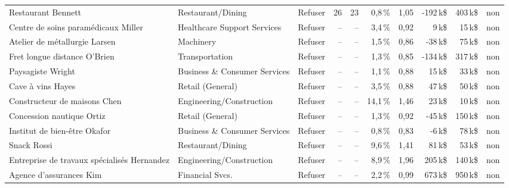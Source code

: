 {\begin{longtable}{p{3.7cm}p{2.5cm}lrrrrrrl}
Restaurant Bennett & Restaurant/Dining & Refuser & 26 & 23 & 0,8\,\% & 1,05 & -192\,k\$ & 403\,k\$ & non \\
Centre de soins paramédicaux Miller & Healthcare Support Services & Refuser & -- & -- & 3,4\,\% & 0,92 & 9\,k\$ & 15\,k\$ & non \\
Atelier de métallurgie Larsen & Machinery & Refuser & -- & -- & 1,5\,\% & 0,86 & -38\,k\$ & 75\,k\$ & non \\
Fret longue distance O'Brien & Transportation & Refuser & -- & -- & 1,3\,\% & 0,85 & -134\,k\$ & 317\,k\$ & non \\
Paysagiste Wright & Business \& Consumer Services & Refuser & -- & -- & 1,1\,\% & 0,88 & 15\,k\$ & 33\,k\$ & non \\
Cave à vins Hayes & Retail (General) & Refuser & -- & -- & 3,5\,\% & 0,88 & 47\,k\$ & 50\,k\$ & non \\
Constructeur de maisons Chen & Engineering/Construction & Refuser & -- & -- & 14,1\,\% & 1,46 & 23\,k\$ & 10\,k\$ & non \\
Concession nautique Ortiz & Retail (General) & Refuser & -- & -- & 1,3\,\% & 0,92 & -45\,k\$ & 150\,k\$ & non \\
Institut de bien-être Okafor & Business \& Consumer Services & Refuser & -- & -- & 0,8\,\% & 0,83 & -6\,k\$ & 78\,k\$ & non \\
Snack Rossi & Restaurant/Dining & Refuser & -- & -- & 9,6\,\% & 1,41 & 81\,k\$ & 53\,k\$ & non \\
Entreprise de travaux spécialisés Hernandez & Engineering/Construction & Refuser & -- & -- & 8,9\,\% & 1,96 & 205\,k\$ & 140\,k\$ & non \\
Agence d'assurances Kim & Financial Svcs. & Refuser & -- & -- & 2,2\,\% & 0,99 & 673\,k\$ & 950\,k\$ & non \\
\end{longtable}}
